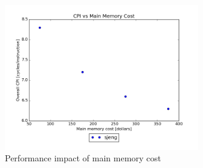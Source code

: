 \documentclass{article}
\begin{document}
\begin{figure}[ht]
    \centering
    \includegraphics[width=0.75\textwidth]{plots/CPI_vs_Main_Mem_Cost.png}
    \caption{Performance impact of main memory cost}
    \label{fig:cpivsmainmemcost}
\end{figure}

\end{document}
